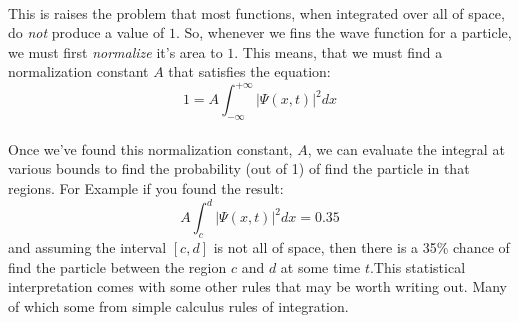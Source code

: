\documentclass[12pt,letterpaper]{book}
\begin{document}
\paragraph*{}This is raises the problem  that most functions, when integrated over all of space, do \textit{not} produce a value of $1$. So, whenever we fins the wave function for a particle, we must first \textit{normalize} it's area to $1$. This means, that we must find a normalization constant $A$ that satisfies the equation:
\begin{equation}
\label{normalize wave function}
1 = A\int_{-\infty}^{+\infty} \big | \Psi(x,t) \big|^2 dx
\end{equation}
\paragraph*{}Once we've found this normalization constant, $A$, we can evaluate the integral at various bounds to find the probability (out of 1) of find the particle in that regions. For Example if you found the result:
\begin{equation}
A\int_{c}^{d} \big | \Psi(x,t) \big|^2 dx = 0.35
\end{equation}
and assuming the interval $[c,d]$ is not all of space, then there is a 35\% chance of find the particle between the region $c$ and $d$ at some time $t$.This statistical interpretation comes with some other rules that may be worth writing out. Many of which some from simple calculus rules of integration.
\end{document}
